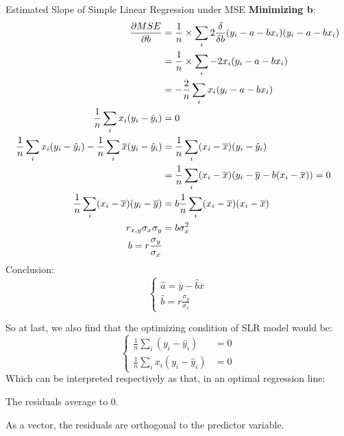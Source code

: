 \begin{ln-derive}{Estimated Slope of Simple Linear Regression under MSE}{}
    \textbf{Minimizing b}: \\
    \begin{align*}
        \pdv{MSE}{b} &= \frac{1}{n} \times \sum_i 2\frac{\delta}{\delta b}(y_i - a - b x_i)(y_i - a - b x_i) \\
        &= \frac{1}{n} \times \sum_i -2x_i(y_i - a - b x_i) \\
        &= -\frac{2}{n} \sum_i x_i(y_i - a - b x_i) \\
        \frac{1}{n} \sum_i x_i(y_i - \hat{y}_i) &= 0 \\
        \frac{1}{n} \sum_i x_i(y_i - \hat{y}_i) - \frac{1}{n} \sum_i \overline{x} (y_i - \hat{y}_i)
        &= \frac{1}{n} \sum_i (x_i - \overline{x}) (y_i - \hat{y}_i) \\
        &= \frac{1}{n} \sum_i (x_i - \overline{x}) (y_i - \overline{y} - b(x_i - \overline{x})) = 0 \\
        \frac{1}{n} \sum_i (x_i - \overline{x}) (y_i - \overline{y})
        &= b \frac{1}{n} \sum_i (x_i - \overline{x}) (x_i - \overline{x}) \\
        r_{x, y} \sigma_x \sigma_y &= b \sigma_x^2 \\
        b = r \frac{\sigma_y}{\sigma_x}
    \end{align*}
    \tcblower
    Conclusion:
    \[
        \begin{cases}
            \hat{a} = \overline{y} - \hat{b} \overline{x} \\
            \hat{b} = r \frac{\sigma_y}{\sigma_x}
        \end{cases}
    \]
\end{ln-derive}
So at last, we also find that the optimizing condition of SLR model would be:
\[
    \begin{cases}
        \frac{1}{n} \sum_i (y_i - \hat{y}_i) &= 0 \\
        \frac{1}{n} \sum_i x_i(y_i - \hat{y}_i) &= 0
    \end{cases}
\]
Which can be interpreted respectively as that, in an optimal regression line:
\begin{bindenum}
    \item The residuals average to 0.
    \item As a vector, the residuals are orthogonal to the predictor variable.
\end{bindenum}
